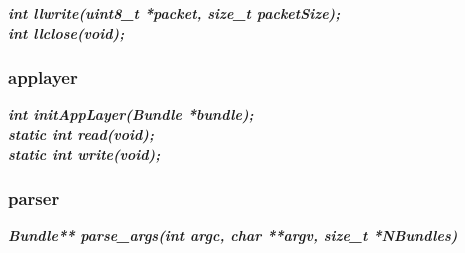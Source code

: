 \documentclass[a4paper]{article}
\begin{document}
\noindent\textbf{\textit{int llwrite(uint8\_t *packet, size\_t packetSize);}}\\

\noindent\textbf{\textit{int llclose(void);}}\\

\subsubsection{applayer}
\noindent\textbf{\textit{int initAppLayer(Bundle *bundle);}}\\

\noindent\textbf{\textit{static int read(void);}}\\

\noindent\textbf{\textit{static int write(void);}}\\

\subsubsection{parser}

\noindent\textbf{\textit{Bundle** parse\_args(int argc, char **argv, size\_t *NBundles)}}\\
\end{document}
